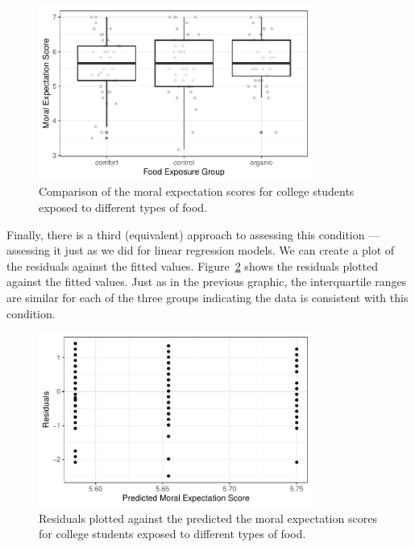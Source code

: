 \documentclass[
  letterpaper,
  DIV=11,
  numbers=noendperiod]{scrreprt}
\theoremstyle{plain}
\theoremstyle{definition}
\theoremstyle{definition}
\theoremstyle{remark}
\begin{document}
\begin{figure}

{\centering \includegraphics[width=0.8\textwidth,height=\textheight]{./images/fig-anovaassessment-variance-organic-alt-1.pdf}

}

\caption{\label{fig-anovaassessment-variance-organic-alt}Comparison of
the moral expectation scores for college students exposed to different
types of food.}

\end{figure}

Finally, there is a third (equivalent) approach to assessing this
condition --- assessing it just as we did for linear regression models.
We can create a plot of the residuals against the fitted values.
Figure~\ref{fig-anovaassessment-variance-organic-alt2} shows the
residuals plotted against the fitted values. Just as in the previous
graphic, the interquartile ranges are similar for each of the three
groups indicating the data is consistent with this condition.

\begin{figure}

{\centering \includegraphics[width=0.8\textwidth,height=\textheight]{./images/fig-anovaassessment-variance-organic-alt2-1.pdf}

}

\caption{\label{fig-anovaassessment-variance-organic-alt2}Residuals
plotted against the predicted the moral expectation scores for college
students exposed to different types of food.}

\end{figure}
\end{document}

